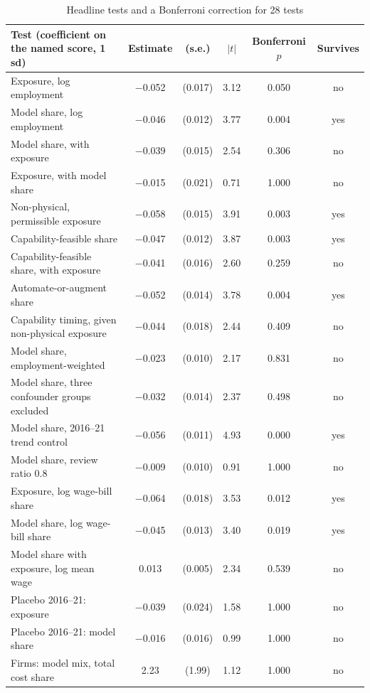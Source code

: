 \begin{table}[tbp]
\centering
\caption{Headline tests and a Bonferroni correction for 28 tests}\label{tab:backtest-tests}
\footnotesize
\begin{tabular}{@{}lccccc@{}}
\toprule
Test (coefficient on the named score, 1 sd) & Estimate & (s.e.) & $|t|$ & Bonferroni $p$ & Survives\\
\midrule
Exposure, log employment & $-$0.052 & (0.017) & 3.12 & 0.050 & no\\
Model share, log employment & $-$0.046 & (0.012) & 3.77 & 0.004 & yes\\
Model share, with exposure & $-$0.039 & (0.015) & 2.54 & 0.306 & no\\
Exposure, with model share & $-$0.015 & (0.021) & 0.71 & 1.000 & no\\
Non-physical, permissible exposure & $-$0.058 & (0.015) & 3.91 & 0.003 & yes\\
Capability-feasible share & $-$0.047 & (0.012) & 3.87 & 0.003 & yes\\
Capability-feasible share, with exposure & $-$0.041 & (0.016) & 2.60 & 0.259 & no\\
Automate-or-augment share & $-$0.052 & (0.014) & 3.78 & 0.004 & yes\\
Capability timing, given non-physical exposure & $-$0.044 & (0.018) & 2.44 & 0.409 & no\\
Model share, employment-weighted & $-$0.023 & (0.010) & 2.17 & 0.831 & no\\
Model share, three confounder groups excluded & $-$0.032 & (0.014) & 2.37 & 0.498 & no\\
Model share, 2016--21 trend control & $-$0.056 & (0.011) & 4.93 & 0.000 & yes\\
Model share, review ratio 0.8 & $-$0.009 & (0.010) & 0.91 & 1.000 & no\\
Exposure, log wage-bill share & $-$0.064 & (0.018) & 3.53 & 0.012 & yes\\
Model share, log wage-bill share & $-$0.045 & (0.013) & 3.40 & 0.019 & yes\\
Model share with exposure, log mean wage & 0.013 & (0.005) & 2.34 & 0.539 & no\\
Placebo 2016--21: exposure & $-$0.039 & (0.024) & 1.58 & 1.000 & no\\
Placebo 2016--21: model share & $-$0.016 & (0.016) & 0.99 & 1.000 & no\\
Firms: model mix, total cost share & 2.23 & (1.99) & 1.12 & 1.000 & no\\

\end{tabular}
\end{table}
